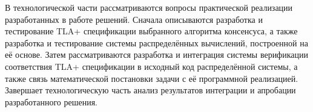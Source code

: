
В технологической части рассматриваются вопросы практической
реализации разработанных в работе решений. Сначала описываются
разработка и тестирование TLA+ спецификации выбранного алгоритма
консенсуса, а также разработка и тестирование системы
распределённых вычислений, построенной на её основе. Затем
рассматриваются разработка и интеграция системы верификации
соответствия TLA+ спецификации в исходный код распределённой
системы, а также связь математической постановки задачи с её
программной реализацией. Завершает технологическую часть анализ
результатов интеграции и апробации разработанного решения.
